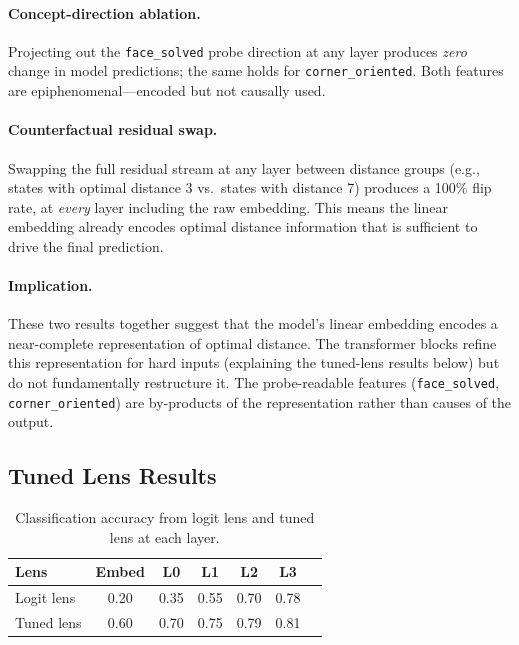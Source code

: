 \documentclass[12pt]{article}
\begin{document}
\paragraph{Concept-direction ablation.}
Projecting out the \texttt{face\_solved} probe direction at any layer produces
\emph{zero} change in model predictions; the same holds for
\texttt{corner\_oriented}.  Both features are epiphenomenal---encoded but not
causally used.

\paragraph{Counterfactual residual swap.}
Swapping the full residual stream at any layer between distance groups (e.g.,
states with optimal distance 3 vs.\ states with distance 7) produces a 100\%
flip rate, at \emph{every} layer including the raw embedding.  This means the
linear embedding already encodes optimal distance information that is sufficient
to drive the final prediction.

\paragraph{Implication.}
These two results together suggest that the model's linear embedding encodes a
near-complete representation of optimal distance.  The transformer blocks refine
this representation for hard inputs (explaining the tuned-lens results below) but
do not fundamentally restructure it.  The probe-readable features
(\texttt{face\_solved}, \texttt{corner\_oriented}) are by-products of the
representation rather than causes of the output.

\subsection{Tuned Lens Results}

\begin{table}[h]
\centering
\small
\begin{tabular}{lcccccc}
\toprule
Lens & Embed & L0 & L1 & L2 & L3 \\
\midrule
Logit lens  & 0.20 & 0.35 & 0.55 & 0.70 & 0.78 \\
Tuned lens  & 0.60 & 0.70 & 0.75 & 0.79 & 0.81 \\
\bottomrule
\end{tabular}
\caption{Classification accuracy from logit lens and tuned lens at each layer.}
\label{tab:lens}
\end{table}
\end{document}
